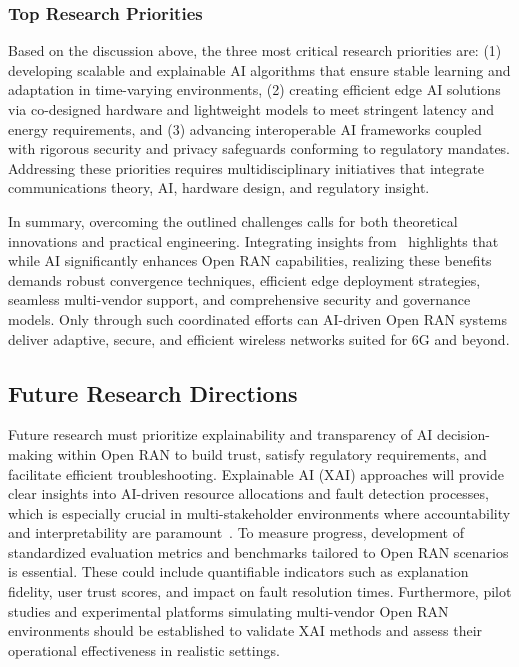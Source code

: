 \documentclass[sigconf]{acmart}
\begin{document}
\subsubsection{Top Research Priorities}
Based on the discussion above, the three most critical research priorities are: (1) developing scalable and explainable AI algorithms that ensure stable learning and adaptation in time-varying environments, (2) creating efficient edge AI solutions via co-designed hardware and lightweight models to meet stringent latency and energy requirements, and (3) advancing interoperable AI frameworks coupled with rigorous security and privacy safeguards conforming to regulatory mandates. Addressing these priorities requires multidisciplinary initiatives that integrate communications theory, AI, hardware design, and regulatory insight.

In summary, overcoming the outlined challenges calls for both theoretical innovations and practical engineering. Integrating insights from~\cite{ref48,ref49,ref50,ref54} highlights that while AI significantly enhances Open RAN capabilities, realizing these benefits demands robust convergence techniques, efficient edge deployment strategies, seamless multi-vendor support, and comprehensive security and governance models. Only through such coordinated efforts can AI-driven Open RAN systems deliver adaptive, secure, and efficient wireless networks suited for 6G and beyond.

\subsection{Future Research Directions}

Future research must prioritize explainability and transparency of AI decision-making within Open RAN to build trust, satisfy regulatory requirements, and facilitate efficient troubleshooting. Explainable AI (XAI) approaches will provide clear insights into AI-driven resource allocations and fault detection processes, which is especially crucial in multi-stakeholder environments where accountability and interpretability are paramount~\cite{ref54}. To measure progress, development of standardized evaluation metrics and benchmarks tailored to Open RAN scenarios is essential. These could include quantifiable indicators such as explanation fidelity, user trust scores, and impact on fault resolution times. Furthermore, pilot studies and experimental platforms simulating multi-vendor Open RAN environments should be established to validate XAI methods and assess their operational effectiveness in realistic settings.
\end{document}
